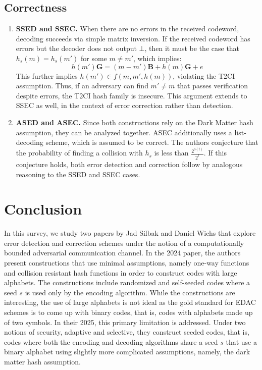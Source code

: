\documentclass[12pt]{article}%
\begin{document}
\subsection{Correctness}

\begin{enumerate}
    \item \textbf{SSED and SSEC.} When there are no errors in the received codeword, decoding succeeds via simple matrix inversion. If the received codeword has errors but the decoder does not output $\bot$, then it must be the case that $h_s(m) = h_s(m')$ for some $m \neq m'$, which implies:
    \[
    h(m')\mathbf{G} = (m - m')\mathbf{B} + h(m)\mathbf{G} + e
    \]
    This further implies $h(m') \in f(m, m', h(m))$, violating the T2CI assumption. Thus, if an adversary can find $m' \neq m$ that passes verification despite errors, the T2CI hash family is insecure. This argument extends to SSEC as well, in the context of error correction rather than detection.

    \item \textbf{ASED and ASEC.} Since both constructions rely on the Dark Matter hash assumption, they can be analyzed together. ASEC additionally uses a list-decoding scheme, which is assumed to be correct. The authors conjecture that the probability of finding a collision with $h_s$ is less than $\frac{2^{o(t)}}{2^t}$. If this conjecture holds, both error detection and correction follow by analogous reasoning to the SSED and SSEC cases.
    
\end{enumerate}

\section{Conclusion}

In this survey, we study two papers by Jad Silbak and Daniel Wichs that explore error detection and correction schemes under the notion of a computationally bounded adversarial communication channel. In the 2024 paper, the authors present constructions that use minimal assumptions, namely one-way functions and collision resistant hash functions in order to construct codes with large alphabets. The constructions include randomized and self-seeded codes where a seed $s$ is used only by the encoding algorithm. While the constructions are interesting, the use of large alphabets is not ideal as the gold standard for EDAC schemes is to come up with binary codes, that is, codes with alphabets made up of two symbols. In their 2025, this primary limitation is addressed. Under two notions of security, adaptive and selective, they construct seeded codes, that is, codes where both the encoding and decoding algorithms share a seed $s$ that use a binary alphabet using slightly more complicated assumptions, namely, the dark matter hash assumption. 
\end{document}
